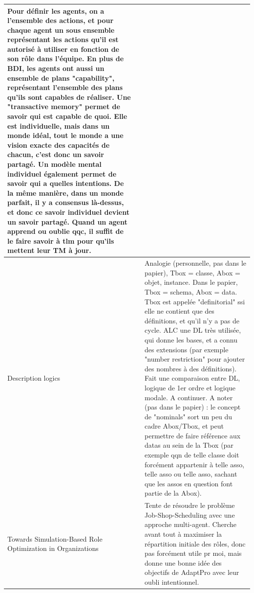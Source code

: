 \documentclass[french]{article}
\begin{document}
\begin{table}[ht!]
\begin{center}
\begin{tabular}{|p{}|p{}|p{}|}
            Pour définir les agents, on a l'ensemble des actions, et pour chaque agent un sous ensemble représentant les actions qu'il est autorisé à utiliser en fonction de son rôle dans l'équipe. En plus de BDI, les agents ont aussi un ensemble de plans "capability", représentant l'ensemble des plans qu'ils sont capables de réaliser.
            Une "transactive memory" permet de savoir qui est capable de quoi. Elle est individuelle, mais dans un monde idéal, tout le monde a une vision exacte des capacités de chacun, c'est donc un savoir partagé. Un modèle mental individuel également permet de savoir qui a quelles intentions. De la même manière, dans un monde parfait, il y a consensus là-dessus, et donc ce savoir individuel devient un savoir partagé.
            Quand un agent apprend ou oublie qqc, il suffit de le faire savoir à tlm pour qu'ils mettent leur TM à jour.
            \\
            \hline
            Description logics\cite{baader_chapter_2008}
            &
            & Analogie (personnelle, pas dans le papier), Tbox = classe, Abox = objet, instance. Dans le papier, Tbox = schema, Abox = data.
            Tbox est appelée "definitorial" ssi elle ne contient que des définitions, et qu'il n'y a pas de cycle.
            ALC une DL très utilisée, qui donne les bases, et a connu des extensions (par exemple "number restriction" pour ajouter des nombres à des définitions). Fait une comparaison entre DL, logique de 1er ordre et logique modale. A continuer.
            A noter (pas dans le papier) : le concept de "nominals" sort un peu du cadre Abox/Tbox, et peut permettre de faire référence aux datas au sein de la Tbox (par exemple qqn de telle classe doit forcément appartenir à telle asso, telle asso ou telle asso, sachant que les assos en question font partie de la Abox).
            \\
            \hline
            Towards Simulation-Based Role Optimization in Organizations \cite{reuter_towards_2017}
            &
            & Tente de résoudre le problème Job-Shop-Scheduling avec une approche multi-agent. Cherche avant tout à maximiser la répartition initiale des rôles, donc pas forcément utile pr moi, mais donne une bonne idée des objectifs de AdaptPro avec leur oubli intentionnel.\\
            \hline
        \end{tabular}
    \end{center}
    \end{table}
    \newpage
\end{document}
